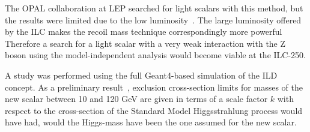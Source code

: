 The OPAL collaboration at LEP searched
for light scalars with this method,
but the  results were limited due to the low luminosity~\cite{Abbiendi:2002in}.
The large luminosity offered by the ILC 
makes the recoil mass technique correspondingly more powerful~\cite{Asner:2013psa}
Therefore a search for a light scalar with a very weak interaction with
the Z boson using the model-independent analysis would become  viable
at the ILC-250.

A study was performed using the full Geant4-based simulation of the
ILD concept.
As a preliminary result~\cite{yanichep},
exclusion cross-section limits for
masses of the new scalar between 10 and 120
GeV are given in terms of a scale factor $k$ with respect to the
cross-section of the Standard Model Higgsstrahlung process would
have had, would the Higgs-mass have been the one assumed for the new scalar.

